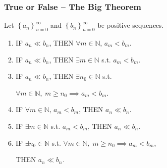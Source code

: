 \begin{frame}[t]
	\fontsize{13}{13}\selectfont
	\frametitle{True or False -- The Big Theorem}

	Let $\displaystyle \left\{ a_{n} \right\}_{n=0}^{\infty}$ and $\displaystyle \left
	\{ b_{n} \right\}_{n=0}^{\infty}$ be positive sequences.
	\vspace{.15cm}
	\begin{enumerate}
		\item IF \; {\color{red} $\displaystyle a_{n}\ll b_{n}$}, \quad THEN \;
			{\color{blue} $\displaystyle \forall m \in \mathbb{N}$, $\displaystyle a_{m}< b_{m}$}.
			\vfill

		\item IF \; {\color{red} $\displaystyle a_{n}\ll b_{n}$}, \quad THEN \;
			{\color{blue} $\displaystyle \exists m \in \mathbb{N}$ s.t. $\displaystyle a_{m}< b_{m}$}.
			\vfill

		\item IF \; {\color{red} $\displaystyle a_{n}\ll b_{n}$}, \quad THEN \;
			{\color{blue} $\displaystyle \exists n_{0}\in \mathbb{N}$ s.t.}
			\vspace{.15cm}

			{\color{blue} $\displaystyle \forall m \in \mathbb{N}, \; m\geq n_{0}\implies a_{m}< b_{m}$}.
			\vfill

		\item IF \; {\color{blue} $\displaystyle \forall m \in \mathbb{N}, \, a_{m}< b_{m}$},
			\quad THEN \; {\color{red} $\displaystyle a_{n}\ll b_{n}$}.
			\vfill

		\item IF \; {\color{blue} $\displaystyle \exists m \in \mathbb{N}$ s.t. $\displaystyle a_{m}< b_{m}$},
			\quad THEN \; {\color{red} $\displaystyle a_{n}\ll b_{n}$}.
			\vfill

		\item IF \; {\color{blue} $\displaystyle \exists n_{0}\in \mathbb{N}$ s.t. $\displaystyle \forall m \in \mathbb{N}, \; m\geq n_{0}\implies a_{m}< b_{m}$},
			\vspace{.15cm}

			THEN \; {\color{red} $\displaystyle a_{n}\ll b_{n}$}.
			\vfill
	\end{enumerate}
\end{frame}

